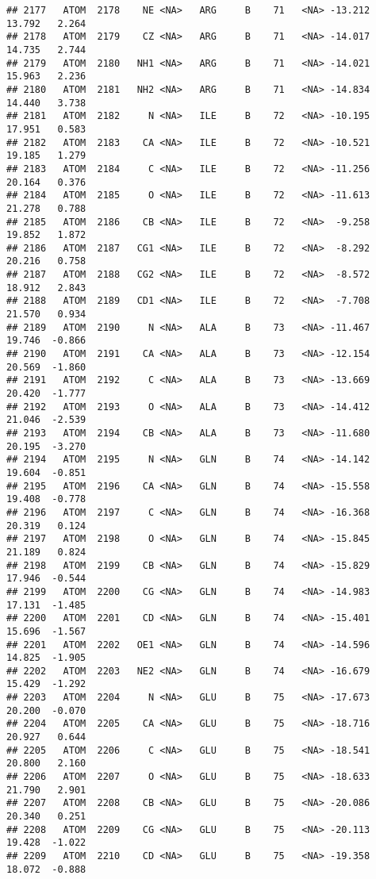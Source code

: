 \documentclass[
]{article}
\begin{document}
\begin{verbatim}
## 2177   ATOM  2178    NE <NA>   ARG     B    71   <NA> -13.212  13.792   2.264
## 2178   ATOM  2179    CZ <NA>   ARG     B    71   <NA> -14.017  14.735   2.744
## 2179   ATOM  2180   NH1 <NA>   ARG     B    71   <NA> -14.021  15.963   2.236
## 2180   ATOM  2181   NH2 <NA>   ARG     B    71   <NA> -14.834  14.440   3.738
## 2181   ATOM  2182     N <NA>   ILE     B    72   <NA> -10.195  17.951   0.583
## 2182   ATOM  2183    CA <NA>   ILE     B    72   <NA> -10.521  19.185   1.279
## 2183   ATOM  2184     C <NA>   ILE     B    72   <NA> -11.256  20.164   0.376
## 2184   ATOM  2185     O <NA>   ILE     B    72   <NA> -11.613  21.278   0.788
## 2185   ATOM  2186    CB <NA>   ILE     B    72   <NA>  -9.258  19.852   1.872
## 2186   ATOM  2187   CG1 <NA>   ILE     B    72   <NA>  -8.292  20.216   0.758
## 2187   ATOM  2188   CG2 <NA>   ILE     B    72   <NA>  -8.572  18.912   2.843
## 2188   ATOM  2189   CD1 <NA>   ILE     B    72   <NA>  -7.708  21.570   0.934
## 2189   ATOM  2190     N <NA>   ALA     B    73   <NA> -11.467  19.746  -0.866
## 2190   ATOM  2191    CA <NA>   ALA     B    73   <NA> -12.154  20.569  -1.860
## 2191   ATOM  2192     C <NA>   ALA     B    73   <NA> -13.669  20.420  -1.777
## 2192   ATOM  2193     O <NA>   ALA     B    73   <NA> -14.412  21.046  -2.539
## 2193   ATOM  2194    CB <NA>   ALA     B    73   <NA> -11.680  20.195  -3.270
## 2194   ATOM  2195     N <NA>   GLN     B    74   <NA> -14.142  19.604  -0.851
## 2195   ATOM  2196    CA <NA>   GLN     B    74   <NA> -15.558  19.408  -0.778
## 2196   ATOM  2197     C <NA>   GLN     B    74   <NA> -16.368  20.319   0.124
## 2197   ATOM  2198     O <NA>   GLN     B    74   <NA> -15.845  21.189   0.824
## 2198   ATOM  2199    CB <NA>   GLN     B    74   <NA> -15.829  17.946  -0.544
## 2199   ATOM  2200    CG <NA>   GLN     B    74   <NA> -14.983  17.131  -1.485
## 2200   ATOM  2201    CD <NA>   GLN     B    74   <NA> -15.401  15.696  -1.567
## 2201   ATOM  2202   OE1 <NA>   GLN     B    74   <NA> -14.596  14.825  -1.905
## 2202   ATOM  2203   NE2 <NA>   GLN     B    74   <NA> -16.679  15.429  -1.292
## 2203   ATOM  2204     N <NA>   GLU     B    75   <NA> -17.673  20.200  -0.070
## 2204   ATOM  2205    CA <NA>   GLU     B    75   <NA> -18.716  20.927   0.644
## 2205   ATOM  2206     C <NA>   GLU     B    75   <NA> -18.541  20.800   2.160
## 2206   ATOM  2207     O <NA>   GLU     B    75   <NA> -18.633  21.790   2.901
## 2207   ATOM  2208    CB <NA>   GLU     B    75   <NA> -20.086  20.340   0.251
## 2208   ATOM  2209    CG <NA>   GLU     B    75   <NA> -20.113  19.428  -1.022
## 2209   ATOM  2210    CD <NA>   GLU     B    75   <NA> -19.358  18.072  -0.888

\end{verbatim}
\end{document}
